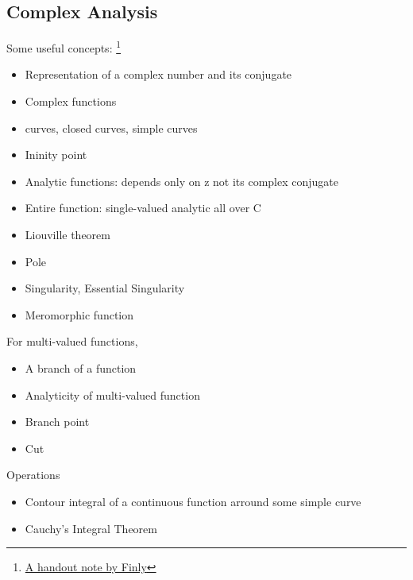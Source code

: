 \documentclass[letterpaper,10pt,english]{sphinxmanual}
\begin{document}
\subsection{Complex Analysis}
\label{math:complex-analysis}
Some useful concepts: \footnote{
\href{http://physics.unm.edu/Courses/Finley/p466F2014/Homework/hw1.pdf}{A handout note by Finly}
}
\begin{itemize}
\item {} 
Representation of a complex number and its conjugate

\item {} 
Complex functions

\item {} 
curves, closed curves, simple curves

\item {} 
Ininity point

\item {} 
Analytic functions: depends only on z not its complex conjugate

\item {} 
Entire function: single-valued analytic all over C

\item {} 
Liouville theorem

\item {} 
Pole

\item {} 
Singularity, Essential Singularity

\item {} 
Meromorphic function

\end{itemize}

For multi-valued functions,
\begin{itemize}
\item {} 
A branch of a function

\item {} 
Analyticity of multi-valued function

\item {} 
Branch point

\item {} 
Cut

\end{itemize}

Operations
\begin{itemize}
\item {} 
Contour integral of a continuous function arround some simple curve

\item {} 
Cauchy's Integral Theorem

\end{itemize}
\end{document}
